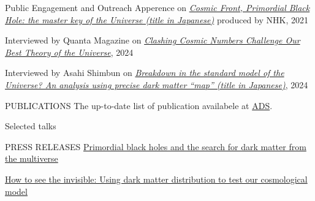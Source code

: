 \documentclass{sty/resume} %
\begin{document}
\begin{rSection}{Public Engagement and Outreach}
  Apperence on \href{https://www.nhk-ondemand.jp/goods/G2021114366SA000/}{\textit{Cosmic Front, Primordial Black Hole: the master key of the Universe (title in Japanese)}} produced by NHK, 2021

  Interviewed by Quanta Magazine on \href{https://www.quantamagazine.org/clashing-cosmic-numbers-challenge-our-best-theory-of-the-universe-20240119/}{\textit{Clashing Cosmic Numbers Challenge Our Best Theory of the Universe}}, 2024
  
  Interviewed by Asahi Shimbun on \href{https://www.asahi.com/articles/ASR4H415RR48ULBH001.html}{\textit{Breakdown in the standard model of the Universe? An analysis using precise dark matter ``map'' (title in Japanese)}}, 2024
\end{rSection}

\clearpage
\begin{rSection}{PUBLICATIONS}
    The up-to-date list of publication availabele at \href{https://ui.adsabs.harvard.edu/search/filter_author_facet_hier_fq_author=AND&filter_author_facet_hier_fq_author=author_facet_hier%3A%221%2FSugiyama%2C%20S%2FSugiyama%2C%20Sunao%22&fq=%7B!type%3Daqp%20v%3D%24fq_author%7D&fq_author=(author_facet_hier%3A%221%2FSugiyama%2C%20S%2FSugiyama%2C%20Sunao%22)&q=pubdate%3A%5B2001-01%20TO%209999-12%5D%20author%3A(%22Sugiyama%2CSunao%22)&sort=date%20desc%2C%20bibcode%20desc&p_=0}{ADS}.
      \vspace{-33em}
    
    
\end{rSection}

\begin{rSection}{Selected talks}
    
\end{rSection}

\begin{rSection}{PRESS RELEASES}
  \href{https://www.ipmu.jp/en/20201224-PBH-multiverse}{Primordial black holes and the search for dark matter from the multiverse}

  \href{https://www.ipmu.jp/en/20230404-darkmatter}{How to see the invisible: Using dark matter distribution to test our cosmological model}
\end{rSection}
\end{document}
